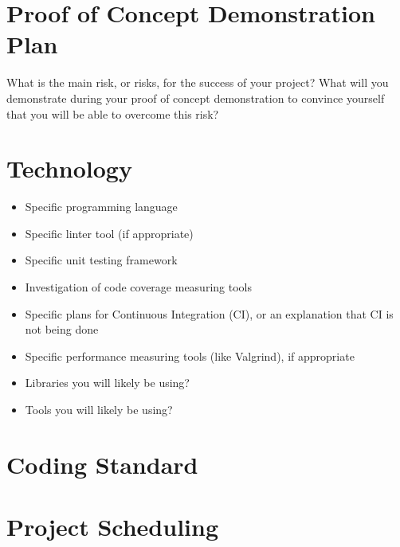 \documentclass{article}
\begin{document}
\section{Proof of Concept Demonstration Plan}

What is the main risk, or risks, for the success of your project?  What will you
demonstrate during your proof of concept demonstration to convince yourself that
you will be able to overcome this risk?

\section{Technology}

\begin{itemize}
\item Specific programming language
\item Specific linter tool (if appropriate)
\item Specific unit testing framework
\item Investigation of code coverage measuring tools
\item Specific plans for Continuous Integration (CI), or an explanation that CI
  is not being done
\item Specific performance measuring tools (like Valgrind), if
  appropriate
\item Libraries you will likely be using?
\item Tools you will likely be using?
\end{itemize}

\section{Coding Standard}

\section{Project Scheduling}

\end{document}

